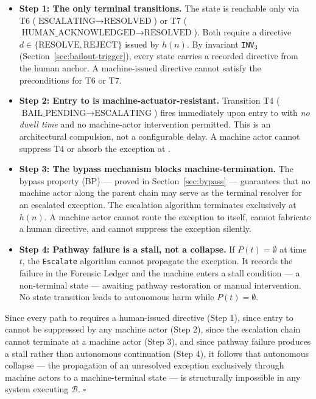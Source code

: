 \begin{itemize}
  \setlength\itemsep{0pt}
  \item[$\bullet$] \textbf{Step 1: The only terminal transitions.}
    The  state is reachable only via T6
    ($\text{ESCALATING} \rightarrow \text{RESOLVED}$) or T7
    ($\text{HUMAN\_ACKNOWLEDGED} \rightarrow \text{RESOLVED}$). Both require a directive
    $d \in \{\text{RESOLVE}, \text{REJECT}\}$ issued by $h(n)$. By invariant
    \texttt{INV}$_3$ (Section~\ref{sec:bailout-trigger}), every  state
    carries a recorded directive from the human anchor. A machine-issued directive
    cannot satisfy the preconditions for T6 or T7.

  \item[$\bullet$] \textbf{Step 2: Entry to  is machine-actuator-resistant.}
    Transition T4 ($\text{BAIL\_PENDING} \rightarrow \text{ESCALATING}$) fires
    immediately upon entry to  with \emph{no dwell time} and no
    machine-actor intervention permitted. This is an architectural compulsion, not a
    configurable delay. A machine actor cannot suppress T4 or absorb the exception at
    .

  \item[$\bullet$] \textbf{Step 3: The bypass mechanism blocks machine-termination.}
    The bypass property (BP) — proved in Section~\ref{sec:bypass} — guarantees that no
    machine actor along the parent chain may serve as the terminal resolver for an
    escalated exception. The escalation algorithm terminates exclusively at $h(n)$. A
    machine actor cannot route the exception to itself, cannot fabricate a human
    directive, and cannot suppress the exception silently.

  \item[$\bullet$] \textbf{Step 4: Pathway failure is a stall, not a collapse.}
    If $P(t) = \emptyset$ at time $t$, the \texttt{Escalate} algorithm cannot
    propagate the exception. It records the failure in the Forensic Ledger and the
    machine enters a stall condition — a non-terminal state — awaiting pathway
    restoration or manual intervention. No state transition leads to autonomous harm
    while $P(t) = \emptyset$.
\end{itemize}

Since every path to  requires a human-issued directive (Step 1), since
entry to  cannot be suppressed by any machine actor (Step 2), since
the escalation chain cannot terminate at a machine actor (Step 3), and since pathway
failure produces a stall rather than autonomous continuation (Step 4), it follows that
autonomous collapse — the propagation of an unresolved exception exclusively through
machine actors to a machine-terminal state — is structurally impossible in any
\bxthree{} system executing $\mathcal{B}$. $\square$


